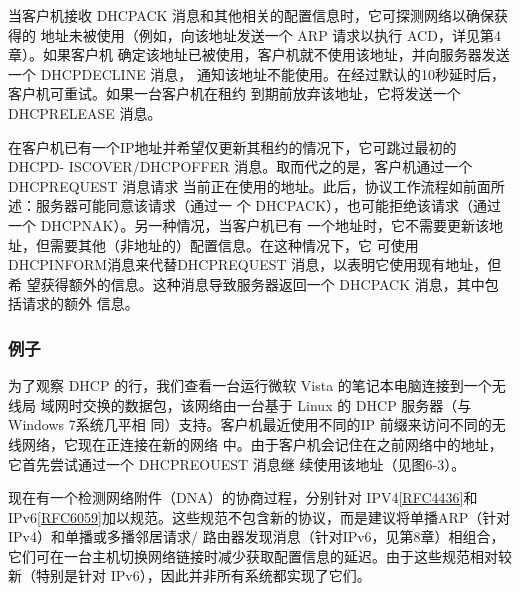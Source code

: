 当客户机接收 DHCPACK 消息和其他相关的配置信息时，它可探测网络以确保获得的
地址未被使用（例如，向该地址发送一个 ARP 请求以执行 ACD，详见第4章）。如果客户机
确定该地址已被使用，客户机就不使用该地址，并向服务器发送一个 DHCPDECLINE 消息，
通知该地址不能使用。在经过默认的10秒延时后，客户机可重试。如果一台客户机在租约
到期前放弃该地址，它将发送一个 DHCPRELEASE 消息。

在客户机已有一个IP地址并希望仅更新其租约的情况下，它可跳过最初的 DHCPD-
ISCOVER/DHCPOFFER 消息。取而代之的是，客户机通过一个 DHCPREQUEST 消息请求
当前正在使用的地址。此后，协议工作流程如前面所述：服务器可能同意该请求（通过一
个 DHCPACK），也可能拒绝该请求（通过一个 DHCPNAK）。另一种情况，当客户机已有
一个地址时，它不需要更新该地址，但需要其他（非地址的）配置信息。在这种情况下，它
可使用 DHCPINFORM消息来代替DHCPREQUEST 消息，以表明它使用现有地址，但希
望获得额外的信息。这种消息导致服务器返回一个 DHCPACK 消息，其中包括请求的额外
信息。

\subsubsection{例子}
为了观察 DHCP 的行，我们查看一台运行微软 Vista 的笔记本电脑连接到一个无线局
域网时交换的数据包，该网络由一台基于 Linux 的 DHCP 服务器（与Windows 7系统几平相
同）支持。客户机最近使用不同的IP 前缀来访问不同的无线网络，它现在正连接在新的网络
中。由于客户机会记住在之前网络中的地址，它首先尝试通过一个 DHCPREOUEST 消息继
续使用该地址（见图6-3）。

\begin{tcolorbox}
  现在有一个检测网络附件（DNA）的协商过程，分别针对
  IPV4\href{https://www.rfc-editor.org/rfc/rfc4436}{\href{https://www.rfc-editor.org/rfc/rfc4436}{[RFC4436]}}和
  IPv6\href{https://www.rfc-editor.org/rfc/rfc6059}{\href{https://www.rfc-editor.org/rfc/rfc6059}{[RFC6059]}}加以规范。这些规范不包含新的协议，而是建议将单播ARP（针对
  IPv4）和单播或多播邻居请求/ 路由器发现消息（针对IPv6，见第8章）相组合，
  它们可在一台主机切换网络链接时减少获取配置信息的延迟。由于这些规范相对较
  新（特别是针对 IPv6），因此并非所有系统都实现了它们。
\end{tcolorbox}

